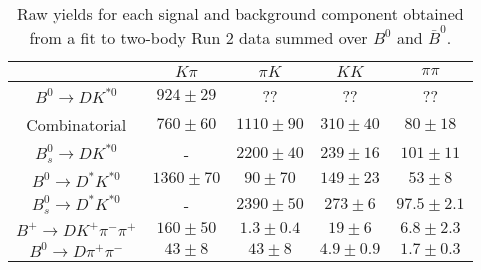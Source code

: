 \begin{table}
  \centering
  \begin{tabular}{ccccc}
      \toprule
       & $K\pi$ & $\pi K$ & $KK$ & $\pi\pi$ \\
      \midrule
      $B^0 \to DK^{*0}$ & $924 \pm 29$ & ?? & ?? & ?? \\
      Combinatorial & $760 \pm 60$ & $1110 \pm 90$ & $310 \pm 40$ & $80 \pm 18$ \\
      $B^0_s \to DK^{*0}$ & \-- & $2200 \pm 40$ & $239 \pm 16$ & $101 \pm 11$ \\
      $B^0 \to D^*K^{*0}$ & $1360 \pm 70$ & $90 \pm 70$ & $149 \pm 23$ & $53 \pm 8$ \\
      $B^0_s \to D^*K^{*0}$ & \-- & $2390 \pm 50$ & $273 \pm 6$ & $97.5 \pm 2.1$ \\
      $B^+ \to DK^+\pi^-\pi^+$ & $160 \pm 50$ & $1.3 \pm 0.4$ & $19 \pm 6$ & $6.8 \pm 2.3$ \\
      $B^0 \to D\pi^+\pi^-$ & $43 \pm 8$ & $43 \pm 8$ & $4.9 \pm 0.9$ & $1.7 \pm 0.3$ \\
      \bottomrule
      \end{tabular}
  \caption{Raw yields for each signal and background component obtained from a fit to two-body Run 2 data summed over $B^0$ and $\bar{B}^0$.}
\label{tab:yields_combined_2body_run2}
\end{table}
